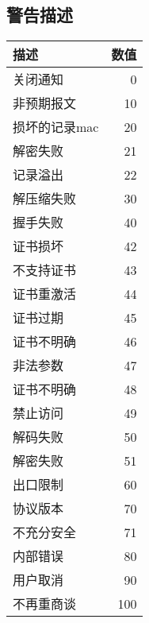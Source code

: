 \documentclass[11pt]{article}
\begin{document}
\subsection{警告描述}

\begin{center}
\begin{tabular}{|l|r|}
        \hline 
        描述& 数值 \\
        \hline
        关闭通知&0 \\
     非预期报文& 10 \\
 损坏的记录mac & 20\\
        解密失败& 21 \\
        记录溢出& 22 \\
     解压缩失败& 30 \\
        握手失败& 40 \\
        证书损坏& 42\\
     不支持证书& 43 \\
     证书重激活& 44\\
        证书过期& 45 \\
     证书不明确&46\\
        非法参数& 47\\
     证书不明确& 48\\
        禁止访问& 49\\
        解码失败& 50\\
        解密失败& 51\\
        出口限制& 60\\
        协议版本& 70\\
     不充分安全& 71\\
        内部错误& 80\\
        用户取消& 90\\
     不再重商谈& 100\\
        \hline

\end{tabular}

\end{center}







%
%
%
\end{document}
